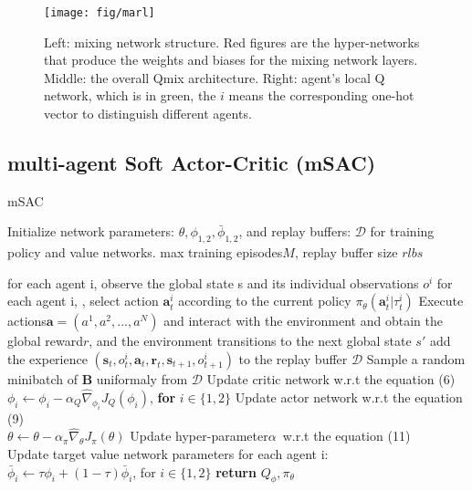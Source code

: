\documentclass[runningheads]{llncs}
\begin{document}
\begin{figure}[!t]
	\centering
	\texttt{[image: fig/marl]}
\caption{Left: mixing network structure. Red figures are the hyper-networks that produce the weights and biases for the mixing network layers. 
Middle: the overall Qmix architecture. 
		Right: agent's local Q network, which is in green, the $i$ means the corresponding one-hot vector to distinguish different agents.}
\end{figure}
\subsection{multi-agent Soft Actor-Critic (mSAC)}
\begin{algorithm}[tb]
	\caption{mSAC}
	\label{alg:algorithm}
	Initialize network parameters: $\theta, \phi_{1,2}, \bar{\phi}_{1,2}$, 
	and replay buffers: $\mathcal{D}$ for training  policy and value networks. 
	max training episodes$M$, replay buffer size $rlbs$
	\begin{algorithmic}[1] \STATE for each agent i, observe the global state s and its individual observations  $o^i$\;
		\STATE for each agent i, , select action $\mathbf{a}_t^i$ according to the current policy $\pi_{\theta}(\mathbf{a}_t^i | \tau_t^i)$ 
		\STATE Execute actions$\mathbf{a}=(a^1,a^2,...,a^N)$ and interact with the environment and obtain the global reward$r$, and the environment transitions to the next global state $s'$
		\STATE add the experience $ \left( \mathbf{s}_{t},{o}^{i}_{t}, \mathbf{a}_{t},\mathbf{r}_{t}, \mathbf{s}_{t+1},{o}^{i}_{t+1} \right)$ to the replay buffer $\mathcal{D}$
		\STATE Sample a random minibatch of  $\mathbf{B}$ uniformaly from  $\mathcal{D}$
		\STATE Update critic network w.r.t the equation (6) \\
		$\phi_{i} \leftarrow \phi_{i}-\alpha_{Q} \hat{\nabla}_{\phi_{i}} J_{Q}\left(\phi_{i}\right)$, \textbf{for} $i \in\{1,2\}$
		\STATE Update actor network  w.r.t the equation (9) \\$\theta \leftarrow \theta-\alpha_{\pi} \hat{\nabla}_{\theta} J_{\pi}(\theta)$
		\STATE Update hyper-parameter$\alpha$\ w.r.t the equation (11) \\
		Update target value network parameters for each agent i:\\
		$\bar{\phi}_{i} \leftarrow \tau \phi_{i}+(1-\tau) \bar{\phi}_{i}$, for $i \in\{1,2\} $
		\ENDFOR
		\ENDFOR
		\ENDFOR
		\STATE \textbf{return} $Q_{\phi},\pi_{\theta}$  
	\end{algorithmic}
\end{algorithm} 
\end{document}
